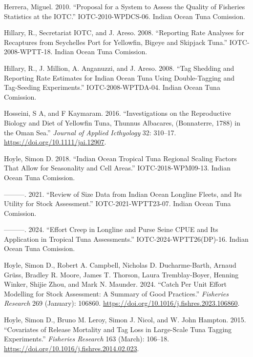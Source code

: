 \documentclass[
]{scrartcl}
\newlength{\cslhangindent}
\newenvironment{CSLReferences}[2] %
 {\begin{list}{}{%
  \setlength{\itemindent}{0pt}
  \setlength{\leftmargin}{0pt}
  \setlength{\parsep}{0pt}
  \ifodd #1
   \setlength{\leftmargin}{\cslhangindent}
   \setlength{\itemindent}{-1\cslhangindent}
  \fi
  \setlength{\itemsep}{#2\baselineskip}}}
 {\end{list}}
\begin{document}
\begin{CSLReferences}{1}{0}
Herrera, Miguel. 2010. {``Proposal for a System to Assess the Quality of
Fisheries Statistics at the {IOTC}.''} IOTC-2010-WPDCS-06. Indian Ocean
Tuna Comission.

Hillary, R., Secretariat IOTC, and J. Areso. 2008. {``Reporting Rate
Analyses for Recaptures from {Seychelles} Port for Yellowfin, Bigeye and
Skipjack Tuna.''} IOTC-2008-WPTT-18. Indian Ocean Tuna Comission.

Hillary, R., J. Million, A. Anganuzzi, and J. Areso. 2008. {``Tag
Shedding and Reporting Rate Estimates for {Indian Ocean} Tuna Using
Double-Tagging and Tag-Seeding Experiments.''} IOTC-2008-WPTDA-04.
Indian Ocean Tuna Comission.

Hosseini, S A, and F Kaymaram. 2016. {``Investigations on the
Reproductive Biology and Diet of Yellowfin Tuna, {Thunnus} Albacares,
({Bonnaterre}, 1788) in the {Oman Sea}.''} \emph{Journal of Applied
Icthyology} 32: 310--17. \url{https://doi.org/10.1111/jai.12907}.

Hoyle, Simon D. 2018. {``Indian {Ocean} Tropical Tuna Regional Scaling
Factors That Allow for Seasonality and Cell Areas.''}
IOTC-2018-WPM09-13. Indian Ocean Tuna Comission.

---------. 2021. {``Review of Size Data from {Indian Ocean} Longline
Fleets, and Its Utility for Stock Assessment.''} IOTC-2021-WPTT23-07.
Indian Ocean Tuna Comission.

---------. 2024. {``Effort Creep in Longline and Purse Seine {CPUE} and
Its Application in Tropical Tuna Assessments.''}
IOTC-2024-WPTT26(DP)-16. Indian Ocean Tuna Comission.

Hoyle, Simon D., Robert A. Campbell, Nicholas D. Ducharme-Barth, Arnaud
Grüss, Bradley R. Moore, James T. Thorson, Laura Tremblay-Boyer, Henning
Winker, Shijie Zhou, and Mark N. Maunder. 2024. {``Catch Per Unit Effort
Modelling for Stock Assessment: {A} Summary of Good Practices.''}
\emph{Fisheries Research} 269 (January): 106860.
\url{https://doi.org/10.1016/j.fishres.2023.106860}.

Hoyle, Simon D., Bruno M. Leroy, Simon J. Nicol, and W. John Hampton.
2015. {``Covariates of Release Mortality and Tag Loss in Large-Scale
Tuna Tagging Experiments.''} \emph{Fisheries Research} 163 (March):
106--18. \url{https://doi.org/10.1016/j.fishres.2014.02.023}.


\end{CSLReferences}
\end{document}
